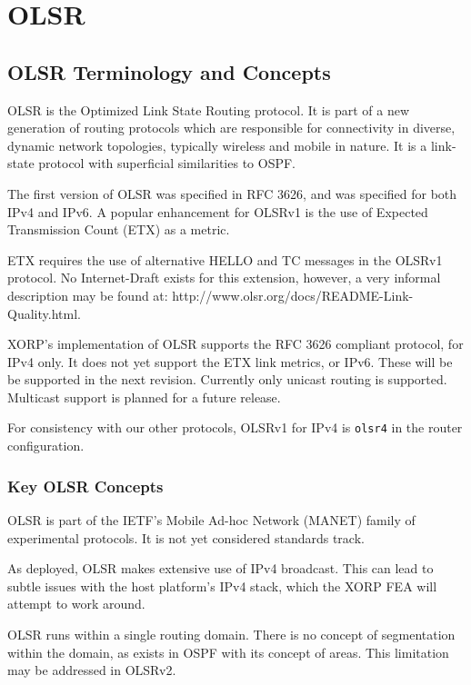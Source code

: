%
% 

\chapter{OLSR}
\label{olsr}
\section{OLSR Terminology and Concepts}

OLSR is the Optimized Link State Routing protocol. It is part of a new
generation of routing protocols which are responsible for connectivity
in diverse, dynamic network topologies, typically wireless and mobile in
nature. It is a link-state protocol with superficial similarities to OSPF.

The first version of OLSR was specified in RFC 3626, and was specified
for both IPv4 and IPv6. A popular enhancement for OLSRv1 is the use of
Expected Transmission Count (ETX) as a metric.

ETX requires the use of alternative HELLO and TC messages in the OLSRv1
protocol. No Internet-Draft exists for this extension, however, a very
informal description may be found at:
\linebreak
{\stt http://www.olsr.org/docs/README-Link-Quality.html}.

XORP's implementation of OLSR supports the RFC 3626 compliant protocol,
for IPv4 only. It does not yet support the ETX link metrics, or IPv6.
These will be be supported in the next revision. Currently only unicast
routing is supported. Multicast support is planned for a future release.

For consistency with our other protocols, OLSRv1 for IPv4 is {\tt olsr4}
in the router configuration.


\subsection{Key OLSR Concepts}

OLSR is part of the IETF's Mobile Ad-hoc Network (MANET) family of
experimental protocols. It is not yet considered standards track.

As deployed, OLSR makes extensive use of IPv4 broadcast. This can lead
to subtle issues with the host platform's IPv4 stack, which the XORP FEA
will attempt to work around.

OLSR runs within a single routing domain. There is no concept of
segmentation within the domain, as exists in OSPF with its
concept of areas. This limitation may be addressed in OLSRv2.

